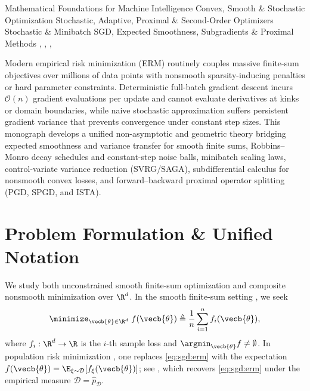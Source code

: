 \documentclass[../../../../master.tex]{subfiles}
\begin{document}
\monographleaf
  {Mathematical Foundations for Machine Intelligence}
  {Convex, Smooth \& Stochastic Optimization}
  {Stochastic, Adaptive, Proximal \& Second-Order Optimizers}
  {Stochastic \& Minibatch SGD, Expected Smoothness, Subgradients \& Proximal Methods}
  {,
   ,
   ,
   }

Modern empirical risk minimization (ERM) routinely couples massive finite-sum objectives over millions of data points with nonsmooth sparsity-inducing penalties or hard parameter constraints. Deterministic full-batch gradient descent incurs $\mathcal{O}(n)$ gradient evaluations per update and cannot evaluate derivatives at kinks or domain boundaries, while naive stochastic approximation suffers persistent gradient variance that prevents convergence under constant step sizes. This monograph develops a unified non-asymptotic and geometric theory bridging expected smoothness and variance transfer for smooth finite sums, Robbins--Monro decay schedules and constant-step noise balls, minibatch scaling laws, control-variate variance reduction (SVRG/SAGA), subdifferential calculus for nonsmooth convex losses, and forward--backward proximal operator splitting (PGD, SPGD, and ISTA).

\section{Problem Formulation \& Unified Notation}
\label{sec:sgd:formulation}

We study both unconstrained smooth finite-sum optimization and composite nonsmooth minimization over $\R^d$. In the smooth finite-sum setting  , we seek
\begin{equation}
\label{eq:sgd:erm}
\minimize_{\vecb{\theta} \in \R^d}\; f(\vecb{\theta}) \triangleq \frac{1}{n}\sum_{i=1}^n f_i(\vecb{\theta}),
\end{equation}
where $f_i : \R^d \to \R$ is the $i$-th sample loss and $\argmin_{\vecb{\theta}} f \ne \emptyset$. In population risk minimization , one replaces \eqref{eq:sgd:erm} with the expectation $f(\vecb{\theta}) = \E_{\xi \sim \mathcal{D}}[f_\xi(\vecb{\theta})]$; see , which recovers \eqref{eq:sgd:erm} under the empirical measure $\mathcal{D} = \hat{p}_{\mathcal{D}}$.
\end{document}
